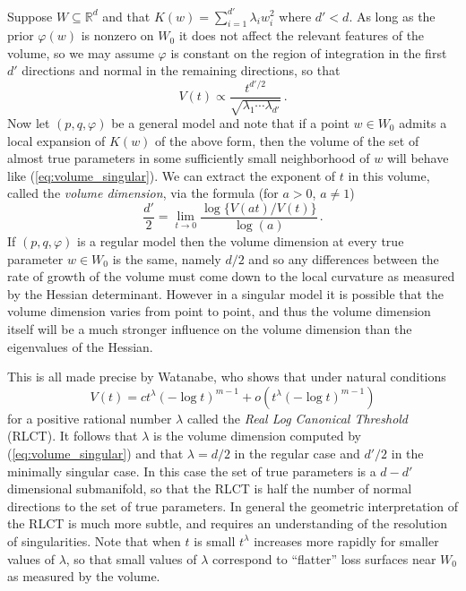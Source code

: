 \documentclass{article} %
\def\be{\begin{equation}}
\def\ee{\end{equation}}
\begin{document}
Suppose $W \subseteq \mathbb{R}^d$ and that $K(w) = \sum_{i=1}^{d'} \lambda_i w_i^2$ where $d' < d$. As long as the prior $\varphi(w)$ is nonzero on $W_0$ it does not affect the relevant features of the volume, so we may assume $\varphi$ is constant on the region of integration in the first $d'$ directions and normal in the remaining directions, so that
\begin{equation}\label{eq:volume_singular}
V(t) \propto \frac{t^{d'/2}}{\sqrt{\lambda_1 \cdots \lambda_{d'}}}\,.
\end{equation}
Now let $(p,q,\varphi)$ be a general model and note that if a point $w \in W_0$ admits a local expansion of $K(w)$ of the above form, then the volume of the set of almost true parameters in some sufficiently small neighborhood of $w$ will behave like (\ref{eq:volume_singular}). We can extract the exponent of $t$ in this volume, called the \emph{volume dimension}, via the formula (for $a > 0$, $a \neq 1$)
\be\label{eq:limit_volumedim}
\frac{d'}{2} = \lim_{t \to 0} \frac{\log\big\{V(at)/V(t)\big\}}{\log(a)}\,.
\ee
If $(p, q, \varphi)$ is a regular model then the volume dimension at every true parameter $w \in W_0$ is the same, namely $d/2$ and so any differences between the rate of growth of the volume must come down to the local curvature as measured by the Hessian determinant. However in a singular model it is possible that the volume dimension varies from point to point, and thus the volume dimension itself will be a much stronger influence on the volume dimension than the eigenvalues of the Hessian. 

This is all made precise by Watanabe, who shows that under natural conditions \citep[Theorem 7.1]{watanabe_algebraic_2009} 
\[
V(t) = c t^\lambda (- \log t)^{m-1} + o( t^\lambda ( - \log t)^{m-1})
\]
for a positive rational number $\lambda$ called the \emph{Real Log Canonical Threshold} (RLCT). It follows that $\lambda$ is the volume dimension computed by (\ref{eq:volume_singular}) and that $\lambda = d/2$ in the regular case and $d'/2$ in the minimally singular case. In this case the set of true parameters is a $d - d'$ dimensional submanifold, so that the RLCT is half the number of normal directions to the set of true parameters. In general the geometric interpretation of the RLCT is much more subtle, and requires an understanding of the resolution of singularities. Note that when $t$ is small $t^\lambda$ increases more rapidly for smaller values of $\lambda$, so that small values of $\lambda$ correspond to ``flatter'' loss surfaces near $W_0$ as measured by the volume.
\end{document}

